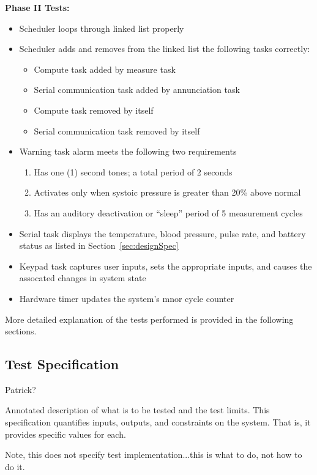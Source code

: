 \documentclass[12pt]{article} %
\begin{document}
    \textbf{Phase II Tests:}
    \begin{itemize}
      \item Scheduler loops through linked list properly
      \item Scheduler adds and removes from the linked list the following tasks
	correctly:
	\begin{itemize}
	  \item Compute task added by measure task
	  \item Serial communication task added by annunciation task
	  \item Compute task removed by itself
	  \item Serial communication task removed by itself
	\end{itemize}
      \item Warning task alarm meets the following two requirements
	\begin{enumerate}
	  \item Has one (1) second tones; a total period of 2 seconds
	  \item Activates only when systoic pressure is greater than 20\% above
	    normal
	  \item Has an auditory deactivation or ``sleep'' period of 5
	    measurement cycles
	\end{enumerate}
	\item Serial task displays the temperature, blood pressure, pulse rate,
	  and battery status as listed in Section~\ref{sec:designSpec}
	\item Keypad task captures user inputs, sets the appropriate inputs,
	  and causes the assocated changes in system state
	\item Hardware timer updates the system's mnor cycle counter
    \end{itemize}

    More detailed explanation of the tests performed is provided in the
    following sections.
    
    \subsection{Test Specification} Patrick?

    Annotated description of what is to be tested and the test limits. This
    specification quantifies inputs, outputs, and constraints on the system.
    That is, it provides specific values for each. 

    Note, this does not specify test implementation...this is what to do, not
    how to do it.
\end{document}
